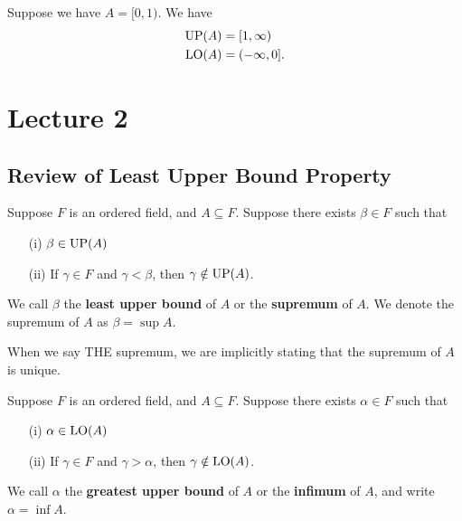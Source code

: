 \documentclass[a4paper]{report}
\begin{document}
\begin{eg}
    Suppose we have \( A = [0,1) \). We have
    \begin{align*}
        \operatorname{UP}(A) &= [1, \infty ) \\
        \operatorname{LO}(A) &= (-\infty, 0].
    \end{align*}
\end{eg}

\section{Lecture 2}

\subsection{Review of Least Upper Bound Property}

\begin{definition}[Supremum]
    Suppose \( F  \) is an ordered field, and \( A \subseteq F  \). Suppose there exists \( \beta \in F  \) such that 
    \begin{enumerate}
        \item[(i)] \( \beta \in \operatorname{UP}(A) \)
        \item[(ii)] If \( \gamma \in F  \) and \( \gamma < \beta  \), then \( \gamma \notin \operatorname{UP}(A) \).
    \end{enumerate}
    We call \( \beta  \) the \textbf{least upper bound} of \( A  \) or the \textbf{supremum} of \( A  \). We denote the supremum of \( A  \) as \( \beta = \sup A  \).
\end{definition}
\begin{remark}
    When we say THE supremum, we are implicitly stating that the supremum of \( A  \) is unique. 
\end{remark}

\begin{definition}[Infimum]
    Suppose \( F  \) is an ordered field, and \( A \subseteq F  \). Suppose there exists \( \alpha \in F  \) such that 
    \begin{enumerate}
        \item[(i)] \( \alpha \in \operatorname{LO}(A) \)
        \item[(ii)] If \( \gamma \in F  \) and \( \gamma > \alpha  \), then \( \gamma \notin \operatorname{LO}(A) \).
    \end{enumerate}
    We call \( \alpha  \) the \textbf{greatest upper bound} of \( A  \) or the \textbf{infimum} of \( A  \), and write \( \alpha = \inf A  \).
\end{definition}
\end{document}
